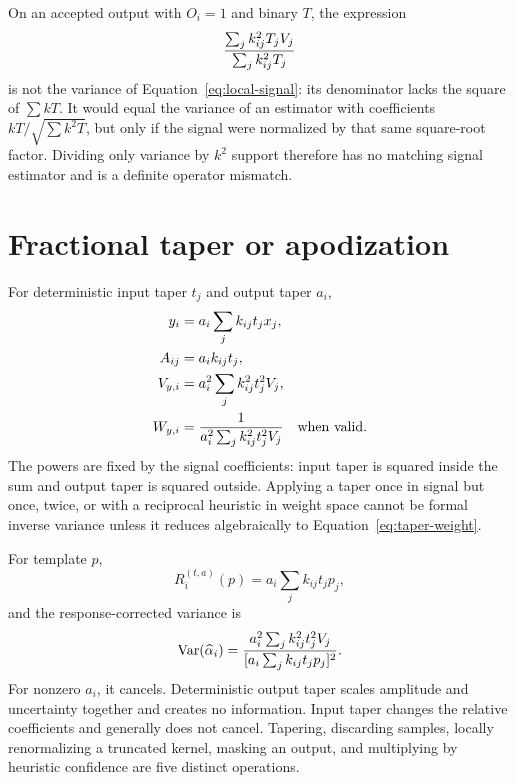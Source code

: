 \documentclass[11pt]{article}
\newcommand{\Var}{\operatorname{Var}}
\begin{document}
On an accepted output with $O_i=1$ and binary $T$, the expression
\begin{equation}
 {\sum_jk_{ij}^2T_jV_j\over\sum_jk_{ij}^2T_j}
 \label{eq:k2-mask-ratio}
\end{equation}
is not the variance of Equation~\eqref{eq:local-signal}: its denominator lacks
the square of $\sum kT$.  It would equal the variance of an estimator with
coefficients $kT/\sqrt{\sum k^2T}$, but only if the signal were normalized by
that same square-root factor.  Dividing only variance by $k^2$ support therefore
has no matching signal estimator and is a definite operator mismatch.

\section{Fractional taper or apodization}
\label{sec:taper}

For deterministic input taper $t_j$ and output taper $a_i$,
\begin{align}
 y_i&=a_i\sum_jk_{ij}t_jx_j,
 \label{eq:taper-signal}\\
 A_{ij}&=a_ik_{ij}t_j,
 \label{eq:taper-A}\\
 V_{y,i}&=a_i^2\sum_jk_{ij}^2t_j^2V_j,
 \label{eq:taper-var}\\
 W_{y,i}&={1\over a_i^2\sum_jk_{ij}^2t_j^2V_j}
 \quad\hbox{when valid}.
 \label{eq:taper-weight}
\end{align}
The powers are fixed by the signal coefficients: input taper is squared inside
the sum and output taper is squared outside.  Applying a taper once in signal
but once, twice, or with a reciprocal heuristic in weight space cannot be
formal inverse variance unless it reduces algebraically to
Equation~\eqref{eq:taper-weight}.

For template $p$,
\begin{equation}
 R_i^{(t,a)}(p)=a_i\sum_jk_{ij}t_jp_j,
 \label{eq:taper-response}
\end{equation}
and the response-corrected variance is
\begin{equation}
 \Var(\widehat\alpha_i)=
 {a_i^2\sum_jk_{ij}^2t_j^2V_j
  \over[a_i\sum_jk_{ij}t_jp_j]^2}.
 \label{eq:taper-response-var}
\end{equation}
For nonzero $a_i$, it cancels.  Deterministic output taper scales amplitude and
uncertainty together and creates no information.  Input taper changes the
relative coefficients and generally does not cancel.  Tapering, discarding
samples, locally renormalizing a truncated kernel, masking an output, and
multiplying by heuristic confidence are five distinct operations.
\end{document}
